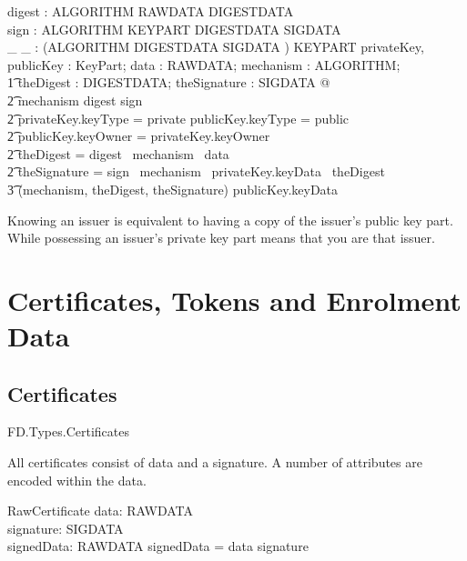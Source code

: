 \begin{axdef}
        digest : ALGORITHM \pfun RAWDATA \fun DIGESTDATA
\\      sign : ALGORITHM \pfun KEYPART \fun DIGESTDATA \fun SIGDATA
\\      \_ \isVerifiedBy \_ : (ALGORITHM \cross DIGESTDATA \cross SIGDATA
) \rel KEYPART
\where 
        \forall privateKey, publicKey : KeyPart; data : RAWDATA;
        mechanism : ALGORITHM;
\\ \t1  theDigest : DIGESTDATA; theSignature : SIGDATA @
\\ \t2  mechanism \in \dom digest \cap \dom sign 
\\ \t2  \land privateKey.keyType = private \land publicKey.keyType = public
\\ \t2          \land publicKey.keyOwner = privateKey.keyOwner
\\      \t2     \land theDigest = digest~ mechanism~ data
\\      \t2     \land theSignature = sign~ mechanism~ privateKey.keyData~
theDigest \iff
\\      \t3   (mechanism, theDigest, theSignature) \isVerifiedBy
publicKey.keyData 
\end{axdef}

Knowing an issuer is equivalent to having a copy of the issuer's
public key part. While possessing an issuer's private key part means 
that you are that issuer.


\section{Certificates, Tokens and Enrolment Data} 
\subsection{Certificates}

\begin{traceunit}{FD.Types.Certificates}
\end{traceunit}

All certificates consist of data and a signature. A number of
attributes are encoded within the data. 

\begin{schema}{RawCertificate}
        data: RAWDATA
\\      signature: SIGDATA
\\      signedData: RAWDATA
\where
        signedData =  data \cat signature
\end{schema}

